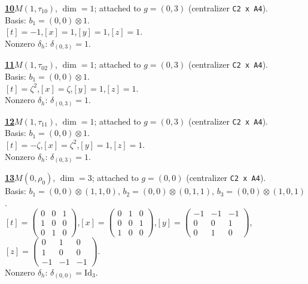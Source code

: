 \begin{samepage}\noindent\textbf{\underline{10}}\quad $M(1,\tau_{10})$, $\dim=1$; attached to $g=(0,3)$ (centralizer \texttt{C2 x A4}).\\
Basis: $b_{1}=(0,0)\otimes 1$.\\
$[t]=-1$,\quad $[x]=1$,\quad $[y]=1$,\quad $[z]=1$.\\
Nonzero $\delta_h$: $\delta_{(0,3)}=1$.\end{samepage}
\medskip

\begin{samepage}\noindent\textbf{\underline{11}}\quad $M(1,\tau_{02})$, $\dim=1$; attached to $g=(0,3)$ (centralizer \texttt{C2 x A4}).\\
Basis: $b_{1}=(0,0)\otimes 1$.\\
$[t]=\zeta^2$,\quad $[x]=\zeta$,\quad $[y]=1$,\quad $[z]=1$.\\
Nonzero $\delta_h$: $\delta_{(0,3)}=1$.\end{samepage}
\medskip

\begin{samepage}\noindent\textbf{\underline{12}}\quad $M(1,\tau_{11})$, $\dim=1$; attached to $g=(0,3)$ (centralizer \texttt{C2 x A4}).\\
Basis: $b_{1}=(0,0)\otimes 1$.\\
$[t]=-\zeta$,\quad $[x]=\zeta^2$,\quad $[y]=1$,\quad $[z]=1$.\\
Nonzero $\delta_h$: $\delta_{(0,3)}=1$.\end{samepage}
\medskip

\begin{samepage}\noindent\textbf{\underline{13}}\quad $M(0,\rho_{0})$, $\dim=3$; attached to $g=(0,0)$ (centralizer \texttt{C2 x A4}).\\
Basis: $b_{1}=(0,0)\otimes (1,1,0)$, $b_{2}=(0,0)\otimes (0,1,1)$, $b_{3}=(0,0)\otimes (1,0,1)$.\\
$[t]=\left(\begin{smallmatrix} 0 & 0 & 1 \\ 1 & 0 & 0 \\ 0 & 1 & 0 \end{smallmatrix}\right)$,\quad $[x]=\left(\begin{smallmatrix} 0 & 1 & 0 \\ 0 & 0 & 1 \\ 1 & 0 & 0 \end{smallmatrix}\right)$,\quad $[y]=\left(\begin{smallmatrix} -1 & -1 & -1 \\ 0 & 0 & 1 \\ 0 & 1 & 0 \end{smallmatrix}\right)$,\quad $[z]=\left(\begin{smallmatrix} 0 & 1 & 0 \\ 1 & 0 & 0 \\ -1 & -1 & -1 \end{smallmatrix}\right)$.\\
Nonzero $\delta_h$: $\delta_{(0,0)}=\mathrm{Id}_{3}$.\end{samepage}
\medskip

